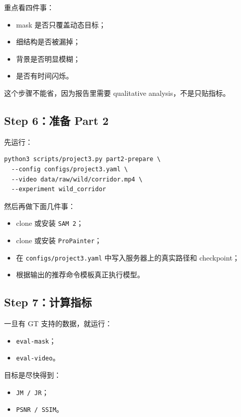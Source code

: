 \documentclass[11pt,a4paper,fontset=none]{ctexart}
\begin{document}
重点看四件事：

\begin{itemize}
  \item mask 是否只覆盖动态目标；
  \item 细结构是否被漏掉；
  \item 背景是否明显模糊；
  \item 是否有时间闪烁。
\end{itemize}

这个步骤不能省，因为报告里需要 qualitative analysis，不是只贴指标。

\subsection*{Step 6：准备 Part 2}

先运行：

\begin{Verbatim}[fontsize=\small]
python3 scripts/project3.py part2-prepare \
  --config configs/project3.yaml \
  --video data/raw/wild/corridor.mp4 \
  --experiment wild_corridor
\end{Verbatim}

然后再做下面几件事：

\begin{itemize}
  \item clone 或安装 \texttt{SAM 2}；
  \item clone 或安装 \texttt{ProPainter}；
  \item 在 \texttt{configs/project3.yaml} 中写入服务器上的真实路径和 checkpoint；
  \item 根据输出的推荐命令模板真正执行模型。
\end{itemize}

\subsection*{Step 7：计算指标}

一旦有 GT 支持的数据，就运行：

\begin{itemize}
  \item \texttt{eval-mask}；
  \item \texttt{eval-video}。
\end{itemize}

目标是尽快得到：

\begin{itemize}
  \item \texttt{JM / JR}；
  \item \texttt{PSNR / SSIM}。
\end{itemize}
\end{document}
